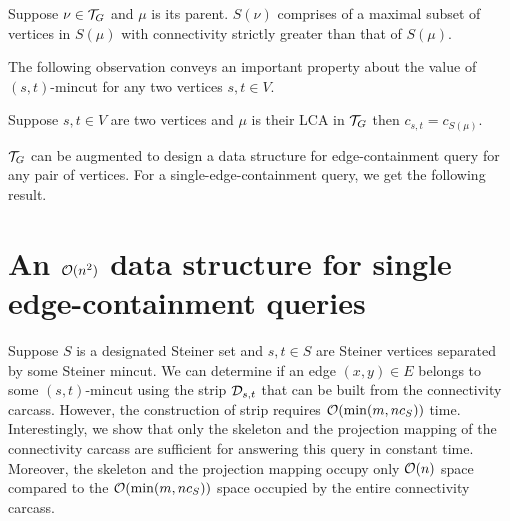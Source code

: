 \begin{observation}
\label{obs:maximal-subset-subtree}
Suppose $\nu \in {\cal T}_G$ and $\mu$ is its parent. $S(\nu)$ comprises of a maximal subset of vertices in $S(\mu)$ with connectivity strictly greater than that of $S(\mu)$.
\end{observation}

The following observation conveys an important property about the value of $(s,t)$-mincut for any two vertices $s,t\in V$.

\begin{observation}
\label{obs:(s,t)-mincut-lca}
Suppose $s,t \in V$ are two vertices and $\mu$ is their LCA in ${\cal T}_G$ then $c_{s,t}=c_{S(\mu)}$.
\end{observation}



${\cal T}_G$ can be augmented to design a data structure for edge-containment query for any pair of vertices. For a single-edge-containment query, we get the following result.

\section{\texorpdfstring{An ${\cal O}(n^2)$}{A quadratic space} data structure for single edge-containment queries} \label{appendix:n2-ds}


Suppose $S$ is a designated Steiner set and $s,t\in S$ are Steiner vertices separated by some Steiner mincut. We can determine if an edge $(x,y)\in E$ belongs to some $(s,t)$-mincut using the strip ${\cal D}_{s,t}$ that can be built from the connectivity carcass. However, the construction of strip requires ${\cal O}(\min(m,nc_S))$ time. Interestingly, we show that only the skeleton and the projection mapping of the connectivity carcass are sufficient for answering this query in constant time. Moreover, the skeleton and the projection mapping occupy only ${\cal O}(n)$ space compared to the ${\cal O}(\min(m,nc_S))$ space occupied by the entire connectivity carcass.


